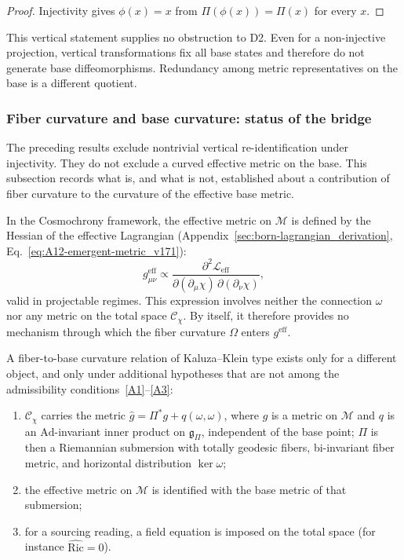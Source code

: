     \begin{proof}
      Injectivity gives $\phi(x)=x$ from $\Pi(\phi(x))=\Pi(x)$ for every $x$.
    \end{proof}

    This vertical statement supplies no obstruction to D2.
    Even for a non-injective projection, vertical transformations fix all base states and therefore do not
    generate base diffeomorphisms.
    Redundancy among metric representatives on the base is a different quotient.

  \subsubsection*{Fiber curvature and base curvature: status of the bridge}
    \label{subsec:stepA-curvature}

    The preceding results exclude nontrivial vertical re-identification under injectivity.
    They do not exclude a curved effective metric on the base.
    This subsection records what is, and what is not, established about a contribution of fiber curvature to the
    curvature of the effective base metric.

    In the Cosmochrony framework, the effective metric on $\mathcal{M}$
    is defined by the Hessian of the effective Lagrangian
    (Appendix~\ref{sec:born-lagrangian_derivation}, Eq.~\eqref{eq:A12-emergent-metric_v171}):
    \begin{equation}
      g^\mathrm{eff}_{\mu\nu}
      \propto
      \frac{\partial^2 \mathcal{L}_\mathrm{eff}}
      {\partial(\partial_\mu \chi)\,\partial(\partial_\nu \chi)},
      \label{eq:eff-metric-hessian}
    \end{equation}
    valid in projectable regimes.
    This expression involves neither the connection $\omega$ nor any metric on the total space $\mathcal{C}_\chi$.
    By itself, it therefore provides no mechanism through which the fiber curvature $\Omega$ enters $g^\mathrm{eff}$.

    A fiber-to-base curvature relation of Kaluza--Klein type exists only for a different object, and only under
    additional hypotheses that are not among the admissibility conditions~\ref{A1}--\ref{A3}:
    \begin{enumerate}[label=(K\arabic*)]
      \item \label{K1}
      $\mathcal{C}_\chi$ carries the metric $\hat g = \Pi^* g + q(\omega, \omega)$, where $g$ is a metric on
      $\mathcal{M}$ and $q$ is an $\mathrm{Ad}$-invariant inner product on $\mathfrak{g}_\Pi$, independent of the
      base point; $\Pi$ is then a Riemannian submersion with totally geodesic fibers, bi-invariant fiber metric,
      and horizontal distribution $\ker\omega$;
      \item \label{K2}
      the effective metric on $\mathcal{M}$ is identified with the base metric of that submersion;
      \item \label{K3}
      for a sourcing reading, a field equation is imposed on the total space (for instance
      $\widehat{\mathrm{Ric}} = 0$).
    \end{enumerate}

